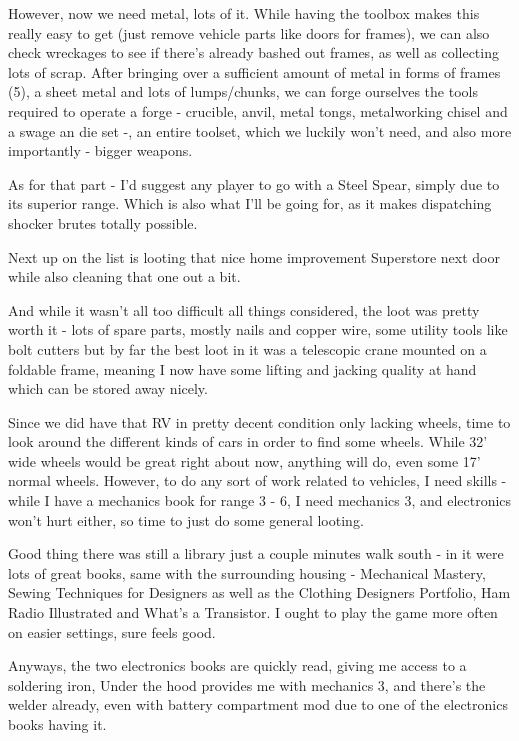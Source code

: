 \documentclass[11pt]{report}
\begin{document}
However, now we need metal, lots of it. While having the toolbox makes this really easy to get (just remove vehicle parts like doors for frames), we can also check wreckages to see if there's already bashed out frames, as well as collecting lots of scrap. After bringing over a sufficient amount of metal in forms of frames (5), a sheet metal and lots of lumps/chunks, we can forge ourselves the tools required to operate a forge - crucible, anvil, metal tongs, metalworking chisel and a swage an die set -, an entire toolset, which we luckily won't need, and also more importantly - bigger weapons.

As for that part - I'd suggest any player to go with a Steel Spear, simply due to its superior range. Which is also what I'll be going for, as it makes dispatching shocker brutes totally possible.

Next up on the list is looting that nice home improvement Superstore next door while also cleaning that one out a bit.

And while it wasn't all too difficult all things considered, the loot was pretty worth it - lots of spare parts, mostly nails and copper wire, some utility tools like bolt cutters but by far the best loot in it was a telescopic crane mounted on a foldable frame, meaning I now have some lifting and jacking quality at hand which can be stored away nicely.

Since we did have that RV in pretty decent condition only lacking wheels, time to look around the different kinds of cars in order to find some wheels. While 32' wide wheels would be great right about now, anything will do, even some 17' normal wheels. However, to do any sort of work related to vehicles, I need skills - while I have a mechanics book for range 3 - 6, I need mechanics 3, and electronics won't hurt either, so time to just do some general looting.

Good thing there was still a library just a couple minutes walk south - in it were lots of great books, same with the surrounding housing - Mechanical Mastery, Sewing Techniques for Designers as well as the Clothing Designers Portfolio, Ham Radio Illustrated and What's a Transistor. I ought to play the game more often on easier settings, sure feels good.

Anyways, the two electronics books are quickly read, giving me access to a soldering iron, Under the hood provides me with mechanics 3, and there's the welder already, even with battery compartment mod due to one of the electronics books having it.
\end{document}
